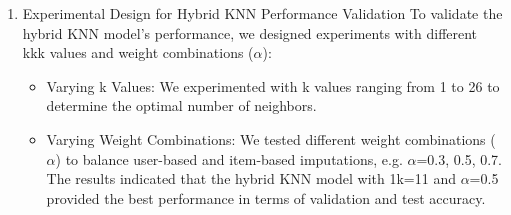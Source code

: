 \documentclass{article}
\begin{document}
\begin{enumerate}
\begin{itemize}
    \end{itemize}
    \item Experimental Design for Hybrid KNN Performance Validation\newline
    To validate the hybrid KNN model's performance, we designed experiments with different kkk values and weight combinations ($\alpha$):
    \begin{itemize}
        \item Varying k Values:\newline
        We experimented with k values ranging from 1 to 26 to determine the optimal number of neighbors.
        \item Varying Weight Combinations:\newline
        We tested different weight combinations ($\alpha$) to balance user-based and item-based imputations, e.g. $\alpha$=0.3, 0.5, 0.7.
        The results indicated that the hybrid KNN model with 1k=11 and $\alpha$=0.5 provided the best performance in terms of validation and test accuracy.
    \end{itemize}
\end{enumerate}
\newpage
\end{document}
